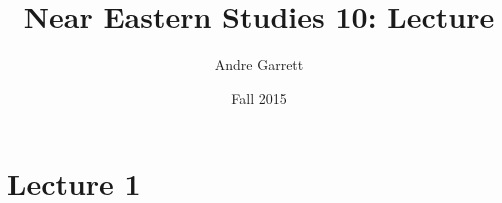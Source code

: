 \documentclass[12pt]{article}
\title{Near Eastern Studies 10: Lecture}
\author{Andre Garrett}
\date{\normalsize Fall 2015}
\begin{document}
\maketitle

\section{Lecture 1}
\end{document}
